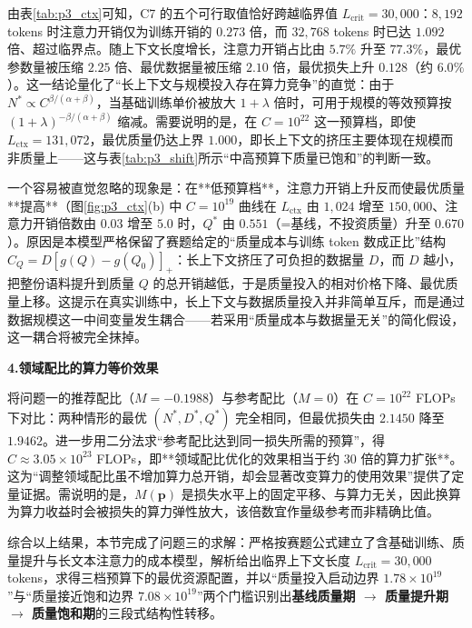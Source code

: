 由表\ref{tab:p3_ctx}可知，C7 的五个可行取值恰好跨越临界值 $L_{\text{crit}}=30{,}000$：$8{,}192$ tokens 时注意力开销仅为训练开销的 $0.273$ 倍，而 $32{,}768$ tokens 时已达 $1.092$ 倍、超过临界点。随上下文长度增长，注意力开销占比由 $5.7\%$ 升至 $77.3\%$，最优参数量被压缩 $2.25$ 倍、最优数据量被压缩 $2.10$ 倍，最优损失上升 $0.128$（约 $6.0\%$）。这一结论量化了“长上下文与规模投入存在算力竞争”的直觉：由于 $N^*\propto C^{\beta/(\alpha+\beta)}$，当基础训练单价被放大 $1+\lambda$ 倍时，可用于规模的等效预算按 $(1+\lambda)^{-\beta/(\alpha+\beta)}$ 缩减。需要说明的是，在 $C=10^{22}$ 这一预算档，即使 $L_{\text{ctx}}=131{,}072$，最优质量仍达上界 $1.000$，即长上下文的挤压主要体现在规模而非质量上——这与表\ref{tab:p3_shift}所示“中高预算下质量已饱和”的判断一致。

一个容易被直觉忽略的现象是：在**低预算档**，注意力开销上升反而使最优质量**提高**（图\ref{fig:p3_ctx}(b) 中 $C=10^{19}$ 曲线在 $L_{\text{ctx}}$ 由 $1{,}024$ 增至 $150{,}000$、注意力开销倍数由 $0.03$ 增至 $5.0$ 时，$Q^{*}$ 由 $0.551$（=基线，不投资质量）升至 $0.670$）。原因是本模型严格保留了赛题给定的“质量成本与训练 token 数成正比”结构 $C_Q=D[g(Q)-g(Q_0)]_+$：长上下文挤压了可负担的数据量 $D$，而 $D$ 越小，把整份语料提升到质量 $Q$ 的总开销越低，于是质量投入的相对价格下降、最优质量上移。这提示在真实训练中，长上下文与数据质量投入并非简单互斥，而是通过数据规模这一中间变量发生耦合——若采用“质量成本与数据量无关”的简化假设，这一耦合将被完全抹掉。

\textbf{4.领域配比的算力等价效果}

将问题一的推荐配比（$M=-0.1988$）与参考配比（$M=0$）在 $C=10^{22}$ FLOPs 下对比：两种情形的最优 $(N^{*},D^{*},Q^{*})$ 完全相同，但最优损失由 $2.1450$ 降至 $1.9462$。进一步用二分法求“参考配比达到同一损失所需的预算”，得 $C\approx3.05\times10^{23}$ FLOPs，即**领域配比优化的效果相当于约 $30$ 倍的算力扩张**。这为“调整领域配比虽不增加算力总开销，却会显著改变算力的使用效果”提供了定量证据。需说明的是，$M(\bm p)$ 是损失水平上的固定平移、与算力无关，因此换算为算力收益时会被损失的算力弹性放大，该倍数宜作量级参考而非精确比值。

综合以上结果，本节完成了问题三的求解：严格按赛题公式建立了含基础训练、质量提升与长文本注意力的成本模型，解析给出临界上下文长度 $L_{\text{crit}}=30{,}000$ tokens，求得三档预算下的最优资源配置，并以“质量投入启动边界 $1.78\times10^{19}$”与“质量接近饱和边界 $7.08\times10^{19}$”两个门槛识别出\textbf{基线质量期 $\to$ 质量提升期 $\to$ 质量饱和期}的三段式结构性转移。
